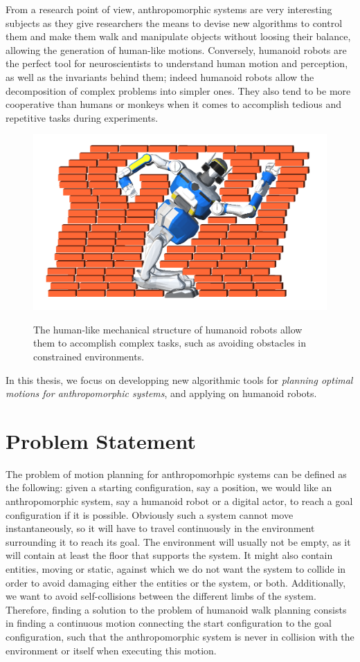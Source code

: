 From a research point of view, anthropomorphic systems are very
interesting subjects as they give researchers the means to devise new
algorithms to control them and make them walk and manipulate objects
without loosing their balance, allowing the generation of human-like
motions. Conversely, humanoid robots are the perfect tool for
neuroscientists to understand human motion and perception, as well as
the invariants behind them; indeed humanoid robots allow the
decomposition of complex problems into simpler ones. They also tend to
be more cooperative than humans or monkeys when it comes to accomplish
tedious and repetitive tasks during experiments.

\begin{figure}
  \centering
      {\includegraphics[width = 0.7\linewidth]
        {src/chap0-introduction/hrp2-brick-wall.png}}
      \caption{The human-like mechanical structure of humanoid robots
        allow them to accomplish complex tasks, such as avoiding
        obstacles in constrained environments.}
      \label{fig:chap0-hrp2-brick-wall}
\end{figure}

In this thesis, we focus on developping new algorithmic tools for
\emph{planning optimal motions for anthropomorphic systems}, and
applying on humanoid robots.

\section{Problem Statement}

The problem of motion planning for anthropomorhpic systems can be
defined as the following: given a starting configuration, say a
position, we would like an anthropomorphic system, say a humanoid
robot or a digital actor, to reach a goal configuration if it is
possible. Obviously such a system cannot move instantaneously, so it
will have to travel continuously in the environment surrounding it to
reach its goal. The environment will usually not be empty, as it will
contain at least the floor that supports the system. It might also
contain entities, moving or static, against which we do not want the
system to collide in order to avoid damaging either the entities or
the system, or both. Additionally, we want to avoid self-collisions
between the different limbs of the system. Therefore, finding a
solution to the problem of humanoid walk planning consists in finding
a continuous motion connecting the start configuration to the goal
configuration, such that the anthropomorphic system is never in
collision with the environment or itself when executing this motion.

